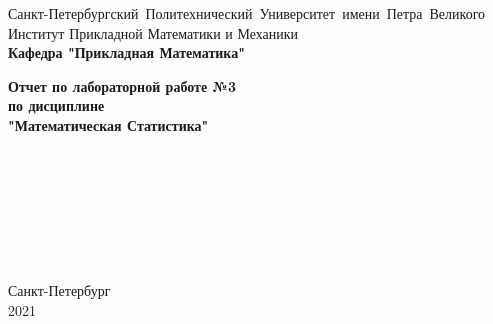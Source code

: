 \documentclass[a4paper]{article}
\author{Тырыкин Я. А. }
\date{March 2021}
\begin{document}
\begin{titlepage}
    \begin{center}
        \mbox{\normalsize{Санкт-Петербургский Политехнический Университет имени Петра Великого}}\\
        \normalsize{Институт Прикладной Математики и Механики}\\
        \large{\textbf{Кафедра "Прикладная Математика"}}
        
        \vfill
        
        \textbf{\Large{Отчет по лабораторной работе №3}}\\
        \textbf{\large{по дисциплине}}\\
        \textbf{\large"Математическая Статистика"}
        
        \vfill
        \\
        \\
        \\
        \\
        \\
        \\
        
    
        
        \vfill
    
    \end{center}
    
    \begin{center} 
        Санкт-Петербург \\
        2021 
    \end{center}
\end{titlepage}
\newpage
\end{document}
